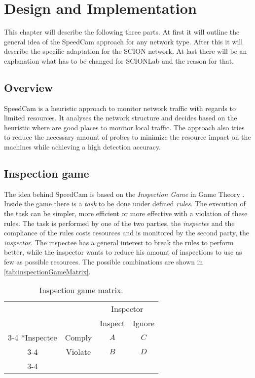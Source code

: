\documentclass[thesis.tex]{subfiles}
\begin{document}
\chapter{Design and Implementation}\label{chap:main}

This chapter will describe the following three parts. At first it will outline the general idea of the SpeedCam approach for any network type. After this it will describe the specific adaptation for the SCION network. At last there will be an explanation what has to be changed for SCIONLab and the reason for that.

\section{Overview}
SpeedCam is a heuristic approach to monitor network traffic with regards to limited resources. It analyses the network structure and decides based on the heuristic where are good places to monitor local traffic. The approach also tries to reduce the necessary amount of probes to minimize the resource impact on the machines while achieving a high detection accuracy.

\section{Inspection game}
The idea behind SpeedCam is based on the \textit{Inspection Game} in Game Theory \cite{Dutta.1999, Owen.2013}. Inside the game there is a \textit{task} to be done under defined \textit{rules}. The execution of the task can be simpler, more efficient or more effective with a violation of these rules. The task is performed by one of the two parties, the \textit{inspectee} and the compliance of the rules costs resources and is monitored by the second party, the \textit{inspector}. The inspectee has a general interest to break the rules to perform better, while the inspector wants to reduce his amount of inspections to use as few as possible resources. The possible combinations are shown in \autoref{tab:inspectionGameMatrix}.

\begin{table}[h]
    \centering
    \begin{tabular}{cc|c|c|}
        & \multicolumn{1}{c}{} & \multicolumn{2}{c}{Inspector}\\
        & \multicolumn{1}{c}{} & \multicolumn{1}{c}{Inspect}  & \multicolumn{1}{c}{Ignore} \\\cline{3-4}
        \multirow{2}*{Inspectee}  & Comply & $A$ & $C$ \\\cline{3-4}
        & Violate & $B$ & $D$ \\\cline{3-4}
    \end{tabular}
    \caption{Inspection game matrix.}
    \label{tab:inspectionGameMatrix}
\end{table}
\end{document}
